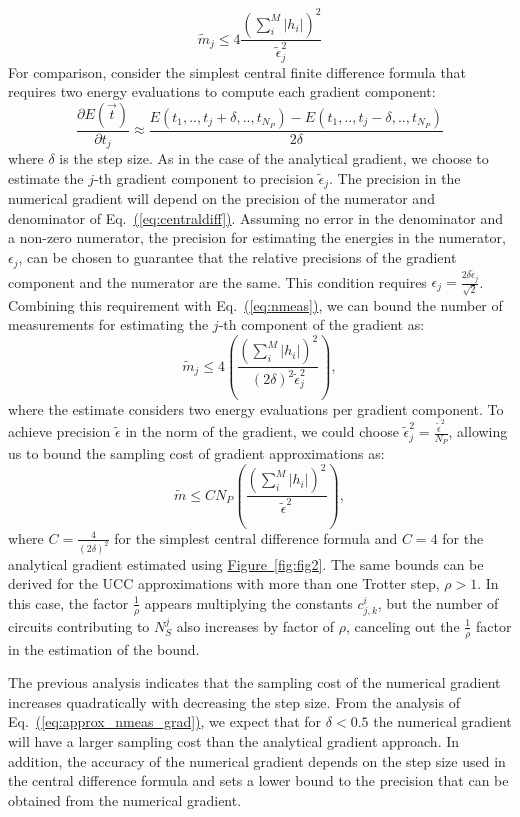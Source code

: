 \documentclass[superscriptaddress,aps,pra,twocolumn,nofootinbib,babel]{revtex4-1}
\newcommand{\eq}[1]{Eq.~\hyperref[eq:#1]{(\ref*{eq:#1})}}
\newcommand{\fig}[1]{\hyperref[fig:#1]{Figure~\ref*{fig:#1}}}
\begin{document}
{\begin{equation}
\tilde{m}_{j} \le 4 \frac{\left(\sum^{M}_{i} |h_i| \right)^2}{\tilde{\epsilon}^2_j} 
\end{equation}
For comparison, consider the simplest central finite difference formula that requires two energy evaluations to compute each gradient component:
\begin{equation}\label{eq:centraldiff}
\frac{\partial E(\vec{t})}{\partial t_j} \approx \frac{E(t_1,..,t_j+\delta,..,t_{N_P})-E(t_1,..,t_j-\delta,..,t_{N_P})}{2\delta}
\end{equation}
where $\delta$ is the step size. As in the case of the analytical gradient, we choose to estimate the $j$-th gradient component to precision $\tilde{\epsilon}_j$. The precision in the numerical gradient will depend on the precision of the numerator and denominator of \eq{centraldiff}. Assuming no error in the denominator and a non-zero numerator, the precision for estimating the energies in the numerator, $\epsilon_j$, can be chosen to guarantee that the relative precisions of the gradient component and the numerator are the same. This condition requires $\epsilon_j = \frac{2\delta\tilde{\epsilon}_j}{\sqrt{2}}$. Combining this requirement with \eq{nmeas}, we can bound the number of measurements for estimating the $j$-th component of the gradient as:
\begin{equation}\label{eq:nmeasgn}
\tilde{m}_{j} \le 4 \left( \frac{(\sum^{M}_{i} |h_i|)^2}{(2\delta)^2 \tilde{\epsilon}_j^2}\right),
\end{equation}
where the estimate considers two energy evaluations per gradient component. To achieve precision $\tilde{\epsilon}$ in the norm of the gradient, we  could choose $\tilde{\epsilon}^2_j = \frac{\tilde{\epsilon}^2}{N_P}$, allowing us to bound the sampling cost of gradient approximations as:
\begin{equation}\label{eq:approx_nmeas_grad}
\tilde{m} \le C N_P\left( \frac{(\sum^{M}_{i} |h_i|)^2}{\tilde{\epsilon}^2}\right),
\end{equation}
where $C=\frac{4}{(2\delta)^2}$ for the simplest central difference formula and $C=4$ for the analytical gradient estimated using \fig{fig2}. The same bounds can be derived for the UCC approximations with more than one Trotter step, $\rho>1$. In this case, the factor $\frac{1}{\rho}$ appears multiplying the constants $c^{i}_{j, k}$, but the number of circuits contributing to $N^{j}_{S}$ also increases by factor of $\rho$, canceling out the $\frac{1}{\rho}$ factor in the estimation of the bound.

The previous analysis indicates that the sampling cost of the numerical gradient increases quadratically with decreasing the step size. From the analysis of \eq{approx_nmeas_grad}, we expect that for $\delta < 0.5$ the numerical gradient will have a larger sampling cost than the analytical gradient approach. In addition, the accuracy of the numerical gradient depends on the step size used in the central difference formula and sets a lower bound to the precision that can be obtained from the numerical gradient. 

}
\end{document}
